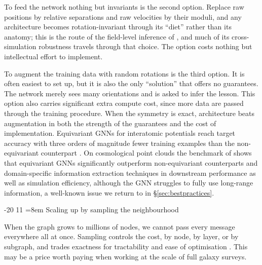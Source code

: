 \documentclass[graybox, envcountchap]{Template/svmult}
\makeatletter
\renewcommand\subsection{\@startsection{subsection}{2}{\z@}%
                       {-20\p@}%
                       {11\p@}%
                       {\normalfont\subsecsize\subsecstyle
                        \rightskip=\z@ \@plus 8em\pretolerance=10000 }}
\makeatother
\begin{document}
To feed the network nothing but invariants is the second option. Replace raw positions by relative separations and raw velocities by their moduli, and any architecture becomes rotation-invariant through its ``diet'' rather than its anatomy; this is the route of the field-level inference of \citet{deSanti2023_fieldlevel_LFI}, and much of its cross-simulation robustness travels through that choice. The option costs nothing but intellectual effort to implement.

To augment the training data with random rotations is the third option. It is often easiest to set up, but it is also the only ``solution'' that offers no guarantees. The network merely sees many orientations and is asked to infer the lesson. This option also carries significant extra compute cost, since more data are passed through the training procedure. When the symmetry is exact, architecture beats augmentation in both the strength of the guarantees and the cost of implementation. Equivariant GNNs for interatomic potentials reach target accuracy with three orders of magnitude fewer training examples than the non-equivariant counterpart \citep{Batzner2022_E3GNN_InteratomicPotentials}. On cosmological point clouds the benchmark of \citet{Balla2024_CosmicBenchmark_SymmetryPreservingData} shows that equivariant GNNs significantly outperform non-equivariant counterparts and domain-specific information extraction techniques in downstream performance as well as simulation efficiency, although the GNN struggles to fully use long-range information, a well-known issue we return to in \S\ref{sec:bestpractices}.


\subsection{Scaling up by sampling the neighbourhood}
\label{subsec:sampling}

When the graph grows to millions of nodes, we cannot pass every message everywhere all at once. Sampling controls the cost, by node, by layer, or by subgraph, and trades exactness for tractability and ease of optimisation \citep{Chiang2019_ClusterGCN, Zeng2020_GraphSAINT_graphsampling}. This may be a price worth paying when working at the scale of full galaxy surveys. 
\end{document}
